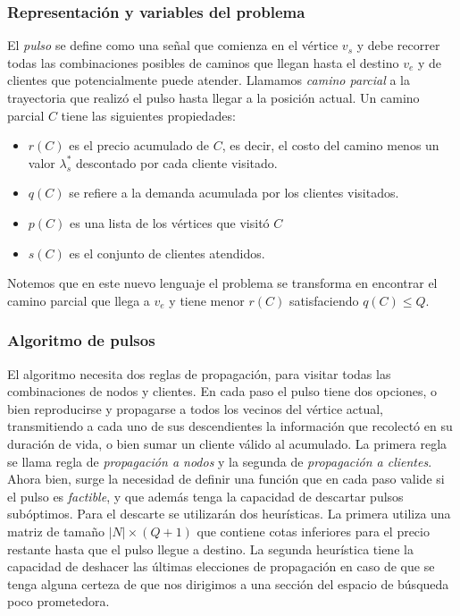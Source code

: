 \subsubsection{Representación y variables del problema}

El \emph{pulso} se define como una señal que comienza en el vértice $v_s$ y debe recorrer todas las combinaciones posibles de caminos que llegan hasta el destino $v_e$ y de clientes que potencialmente puede atender. Llamamos \emph{camino parcial} a la trayectoria que realizó el pulso hasta llegar a la posición actual. Un camino parcial $C$ tiene las siguientes propiedades:

\begin{itemize}
    \item $r(C)$ es el precio acumulado de $C$, es decir, el costo del camino menos un valor $\lambda^{*}_s$ descontado por cada cliente visitado.
    \item $q(C)$ se refiere a la demanda acumulada por los clientes visitados.
    \item $p(C)$ es una lista de los vértices que visitó $C$
    \item $s(C)$ es el conjunto de clientes atendidos.
\end{itemize}

Notemos que en este nuevo lenguaje el problema se transforma en encontrar el camino parcial que llega a $v_e$ y tiene menor $r(C)$ satisfaciendo $q(C) \leq Q$.

\subsubsection{Algoritmo de pulsos}

El algoritmo necesita dos reglas de propagación, para visitar todas las combinaciones de nodos y clientes. En cada paso el pulso tiene dos opciones, o bien reproducirse y propagarse a todos los vecinos del vértice actual, transmitiendo a cada uno de sus descendientes la información que recolectó en su duración de vida, o bien sumar un cliente válido al acumulado. La primera regla se llama regla de \emph{propagación a nodos} y la segunda de \emph{propagación a clientes}. Ahora bien, surge la necesidad de definir una función que en cada paso valide si el pulso es \emph{factible}, y que además tenga la capacidad de descartar pulsos subóptimos. Para el descarte se utilizarán dos heurísticas. La primera utiliza una matriz de tamaño $|N| \times (Q+1)$ que contiene cotas inferiores para el precio restante hasta que el pulso llegue a destino. La segunda heurística tiene la capacidad de deshacer las últimas elecciones de propagación en caso de que se tenga alguna certeza de que nos dirigimos a una sección del espacio de búsqueda poco prometedora.

